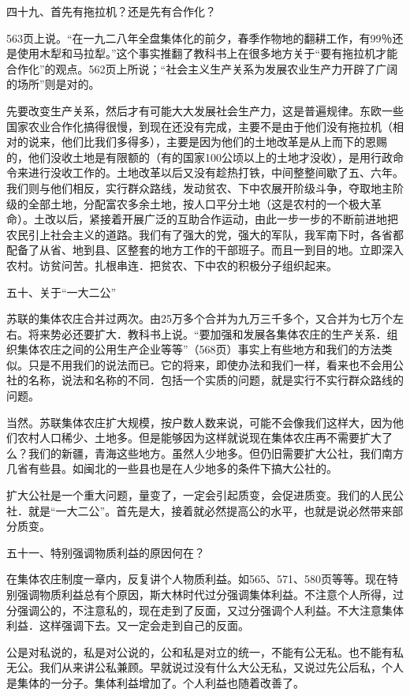 四十九、首先有拖拉机？还是先有合作化？

563页上说。“在一九二八年全盘集体化的前夕，春季作物地的翻耕工作，有99％还是使用木犁和马拉犁。”这个事实推翻了教科书上在很多地方关于“要有拖拉机才能合作化”的观点。562页上所说；“社会主义生产关系为发展农业生产力开辟了广阔的场所”则是对的。

先要改变生产关系，然后才有可能大大发展社会生产力，这是普遍规律。东欧一些国家农业合作化搞得很慢，到现在还没有完成，主要不是由于他们没有拖拉机（相对的说来，他们比我们多得多），主要是因为他们的土地改革是从上而下的恩赐的，他们没收土地是有限额的（有的国家100公顷以上的土地才没收），是用行政命令来进行没收工作的。土地改革以后又没有趁热打铁，中间整整间歇了五、六年。我们则与他们相反，实行群众路线，发动贫农、下中农展开阶级斗争，夺取地主阶级的全部土地，分配富农多余土地，按人口平分土地（这是农村的一个极大革命）。土改以后，紧接着开展广泛的互助合作运动，由此一步一步的不断前进地把农民引上社会主义的道路。我们有了强大的党，强大的军队，我军南下时，各省都配备了从省、地到县、区整套的地方工作的干部班子。而且一到目的地。立即深入农村。访贫问苦。扎根串连．把贫农、下中农的积极分子组织起来。

五十、关于“一大二公”

苏联的集体农庄合并过两次。由25万多个合并为九万三千多个，又合并为七万个左右。将来势必还要扩大．教科书上说。“要加强和发展各集体农庄的生产关系．组织集体农庄之间的公用生产企业等等”（568页）事实上有些地方和我们的方法类似。只是不用我们的说法而已。它的将来，即使办法和我们一样，看来也不会用公社的名称，说法和名称的不同．包括一个实质的问题，就是实行不实行群众路线的问题。

当然。苏联集体农庄扩大规模，按户数人数来说，可能不会像我们这样大，因为他们农村人口稀少、土地多。但是能够因为这样就说现在集体农庄再不需要扩大了么？我们的新疆，青海这些地方。虽然人少地多。但仍旧需要扩大公社，我们南方几省有些县。如闽北的一些县也是在人少地多的条件下搞大公社的。

扩大公社是一个重大问题，量变了，一定会引起质变，会促进质变。我们的人民公社．就是“一大二公”。首先是大，接着就必然提高公的水平，也就是说必然带来部分质变。

五十一、特别强调物质利益的原因何在？

在集体农庄制度一章内，反复讲个人物质利益。如565、571、580页等等。现在特别强调物质利益总有个原因，斯大林时代过分强调集体利益。不注意个人所得，过分强调公的，不注意私的，现在走到了反面，又过分强调个人利益。不大注意集体利益．这样强调下去。又一定会走到自己的反面。

公是对私说的，私是对公说的，公和私是对立的统一，不能有公无私。也不能有私无公。我们从来讲公私兼顾。早就说过没有什么大公无私，又说过先公后私，个人是集体的一分子。集体利益增加了。个人利益也随着改善了。

